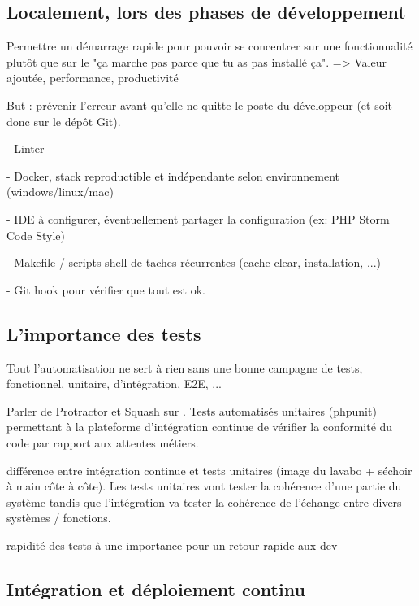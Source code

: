 \subsection{Localement, lors des phases de développement}


Permettre un démarrage rapide pour pouvoir se concentrer sur une fonctionnalité plutôt que sur le "ça marche pas parce que tu as pas installé ça". => Valeur ajoutée, performance, productivité

But : prévenir l'erreur avant qu'elle ne quitte le poste du développeur (et soit donc sur le dépôt Git).

-  Linter

-  Docker, stack reproductible et indépendante selon environnement (windows/linux/mac) 

- IDE à configurer, éventuellement partager la configuration (ex: PHP Storm Code Style)

-  Makefile / scripts shell de taches récurrentes (cache clear, installation, ...)

- Git hook pour vérifier que tout est ok.

\subsection{L'importance des tests}


Tout l'automatisation ne sert à rien sans une bonne campagne de tests, fonctionnel, unitaire, d'intégration, E2E, ...

Parler de Protractor et Squash sur \bv. Tests automatisés unitaires (phpunit) permettant à la plateforme d'intégration continue de vérifier la conformité du code par rapport aux attentes métiers.

différence entre intégration continue et tests unitaires (image du lavabo + séchoir à main côte à côte). Les tests unitaires vont tester la cohérence d'une partie du système tandis que l'intégration va tester la cohérence de l'échange entre divers systèmes / fonctions.

rapidité des tests à une importance pour un retour rapide aux dev

\subsection{Intégration et déploiement continu}

